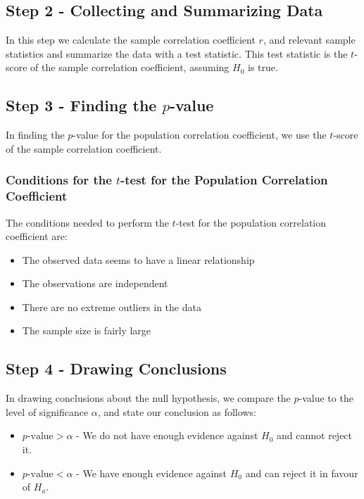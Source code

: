 \documentclass[12pt letter]{report}
\begin{document}
\subsection{Step 2 - Collecting and Summarizing Data}

In this step we calculate the sample correlation coefficient $r$, and relevant sample statistics and summarize the data
with a test statistic. This test statistic is the $t$-score of the sample correlation coefficient, assuming $H_0$ is
true.

\subsection{Step 3 - Finding the $p$-value}

In finding the $p$-value for the population correlation coefficient, we use the $t$-score of the sample correlation
coefficient.


\subsubsection{Conditions for the $t$-test for the Population Correlation Coefficient}

The conditions needed to perform the $t$-test for the population correlation coefficient are:
\begin{itemize}
  \item The observed data seems to have a linear relationship
  \item The observations are independent
  \item There are no extreme outliers in the data
  \item The sample size is fairly large
\end{itemize}

\subsection{Step 4 - Drawing Conclusions}

In drawing conclusions about the null hypothesis, we compare the $p$-value to the level of significance $\alpha $,
and state our conclusion as follows:
\begin{itemize}
  \item $p\text{-value} > \alpha$ - We do not have enough evidence against $H_0$ and cannot reject it.
  \item $p\text{-value} < \alpha$ - We have enough evidence against $H_0$ and can reject it in favour of $H_a$.
\end{itemize}
\end{document}

